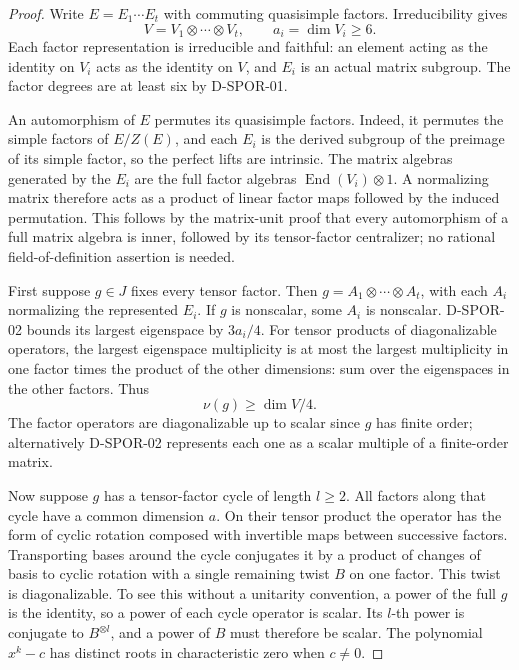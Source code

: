 \begin{proof}
Write $E=E_1\cdots E_t$ with commuting quasisimple factors.
Irreducibility gives
\[
                   V=V_1\otimes\cdots\otimes V_t,
                   \qquad a_i=\dim V_i\ge6.                 \tag{SPOR.4}
\]
Each factor representation is irreducible and faithful: an element
acting as the identity on $V_i$ acts as the identity on $V$, and
$E_i$ is an actual matrix subgroup.  The factor degrees are at
least six by D-SPOR-01.

An automorphism of $E$ permutes its quasisimple factors.  Indeed,
it permutes the simple factors of $E/Z(E)$, and each $E_i$ is
the derived subgroup of the preimage of its simple factor, so
the perfect lifts are intrinsic.  The matrix algebras generated
by the $E_i$ are the full factor algebras
$\operatorname{End}(V_i)\otimes1$.  A normalizing matrix therefore
acts as a product of linear factor maps followed by the induced
permutation.  This follows by the matrix-unit proof that every
automorphism of a full matrix algebra is inner, followed by its
tensor-factor centralizer; no rational field-of-definition
assertion is needed.

First suppose $g\in J$ fixes every tensor factor.  Then
$g=A_1\otimes\cdots\otimes A_t$, with each $A_i$ normalizing
the represented $E_i$.  If $g$ is nonscalar, some $A_i$ is
nonscalar.  D-SPOR-02 bounds its largest eigenspace by $3a_i/4$.
For tensor products of diagonalizable operators, the largest
eigenspace multiplicity is at most the largest multiplicity in
one factor times the product of the other dimensions: sum over
the eigenspaces in the other factors.  Thus
\[
                              \nu(g)\ge\dim V/4.             \tag{SPOR.5}
\]
The factor operators are diagonalizable up to scalar since $g$
has finite order; alternatively D-SPOR-02 represents each one
as a scalar multiple of a finite-order matrix.

Now suppose $g$ has a tensor-factor cycle of length $l\ge2$.
All factors along that cycle have a common dimension $a$.
On their tensor product the operator has the form of cyclic
rotation composed with invertible maps between successive factors.
Transporting bases around the cycle conjugates it by a product
of changes of basis to cyclic rotation with a single remaining
twist $B$ on one factor.  This twist is diagonalizable.  To see
this without a unitarity convention, a power of the full $g$ is
the identity, so a power of each cycle operator is scalar.
Its $l$-th power is conjugate to $B^{\otimes l}$, and a power
of $B$ must therefore be scalar.  The polynomial $x^k-c$ has
distinct roots in characteristic zero when $c\ne0$.


\end{proof}
